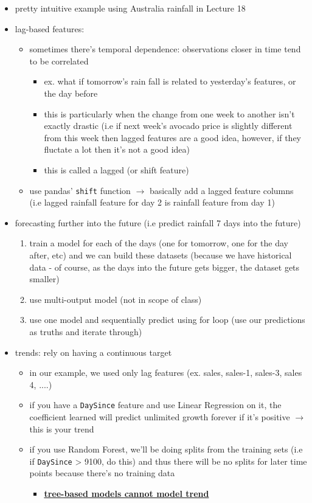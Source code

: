 \documentclass[10.5pt,a4paper, fleqn, dvipsnames]{article}
\begin{document}
\begin{itemize}
    \item pretty intuitive example using Australia rainfall in Lecture 18 
    \item lag-based features: 
    \begin{itemize}
        \item sometimes there's temporal dependence: observations closer in time tend to be correlated 
        \begin{itemize}[leftmargin = 2em]
            \item ex. what if tomorrow's rain fall is related to yesterday's features, or the day before
            \item this is particularly when the change from one week to another isn't exactly drastic (i.e if next week's avocado price is slightly different from this week then lagged features are a good idea, however, if they fluctate a lot then it's not a good idea)
            \item this is called a lagged (or shift feature)
        \end{itemize}
        \item use pandas' \lstinline{shift} function $\rightarrow$ basically add a lagged feature columns (i.e lagged rainfall feature for day 2 is rainfall feature from day 1)
    \end{itemize}
    \item forecasting further into the future (i.e predict rainfall 7 days into the future)
    \begin{enumerate} 
        \item train a model for each of the days (one for tomorrow, one for the day after, etc) and we can build these datasets (because we have historical data - of course, as the days into the future gets bigger, the dataset gets smaller)
        \item use multi-output model (not in scope of class)
        \item use one model and sequentially predict using for loop (use our predictions as truths and iterate through)
    \end{enumerate}
    \item trends: rely on having a continuous target
    \begin{itemize}
        \item in our example, we used only lag features (ex. sales, sales-1, sales-3, sales 4, ....)
        \item if you have a \lstinline{DaySince} feature and use Linear Regression on it, the coefficient learned will predict unlimited growth forever if it's positive $\rightarrow$ this is your trend 
        \item if you use Random Forest, we'll be doing splits from the training sets (i.e if \lstinline{DaySince} > 9100, do this) and thus there will be no splits for later time points because there's no training data
        \begin{itemize}[leftmargin = 2em]
            \item \textbf{\ul{tree-based models cannot model trend}}
        \end{itemize}
    \end{itemize}
\end{itemize}
\end{document}
